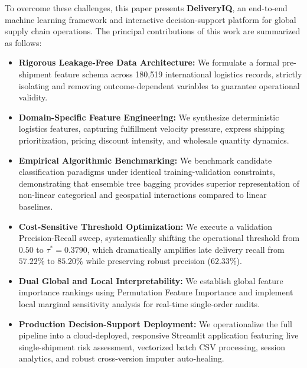 \documentclass[journal,10pt,twocolumn]{IEEEtran}
\begin{document}
To overcome these challenges, this paper presents \textbf{DeliveryIQ}, an end-to-end machine learning framework and interactive decision-support platform for global supply chain operations. The principal contributions of this work are summarized as follows:
\begin{itemize}
    \item \textbf{Rigorous Leakage-Free Data Architecture:} We formulate a formal pre-shipment feature schema across 180,519 international logistics records, strictly isolating and removing outcome-dependent variables to guarantee operational validity.
    \item \textbf{Domain-Specific Feature Engineering:} We synthesize deterministic logistics features, capturing fulfillment velocity pressure, express shipping prioritization, pricing discount intensity, and wholesale quantity dynamics.
    \item \textbf{Empirical Algorithmic Benchmarking:} We benchmark candidate classification paradigms under identical training-validation constraints, demonstrating that ensemble tree bagging provides superior representation of non-linear categorical and geospatial interactions compared to linear baselines.
    \item \textbf{Cost-Sensitive Threshold Optimization:} We execute a validation Precision-Recall sweep, systematically shifting the operational threshold from $0.50$ to $\tau^* = 0.3790$, which dramatically amplifies late delivery recall from $57.22\%$ to $85.20\%$ while preserving robust precision ($62.33\%$).
    \item \textbf{Dual Global and Local Interpretability:} We establish global feature importance rankings using Permutation Feature Importance and implement local marginal sensitivity analysis for real-time single-order audits.
    \item \textbf{Production Decision-Support Deployment:} We operationalize the full pipeline into a cloud-deployed, responsive Streamlit application featuring live single-shipment risk assessment, vectorized batch CSV processing, session analytics, and robust cross-version imputer auto-healing.
\end{itemize}
\end{document}
